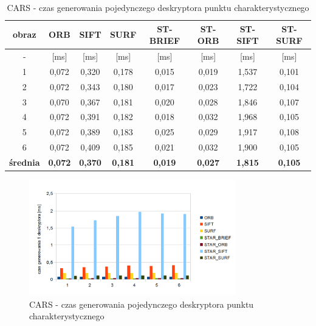 \begin{table}[htbp]
  \centering
  \caption{CARS - czas generowania pojedynczego deskryptora punktu charakterystycznego}
    \begin{tabular}{|c|c|c|c|c|c|c|c|}\hline

    obraz & \textbf{ORB} & \textbf{SIFT} & \textbf{SURF} & \textbf{ST-BRIEF} & \textbf{ST-ORB} & \textbf{ST-SIFT} & \textbf{ST-SURF} \\\hline

    - & [ms] & [ms] & [ms] & [ms] & [ms] & [ms] & [ms] \\\hline
    1 & 0,072 & 0,320 & 0,178 & 0,015 & 0,019 & 1,537 & 0,101 \\
    2 & 0,072 & 0,343 & 0,180 & 0,017 & 0,023 & 1,722 & 0,104 \\
    3 & 0,070 & 0,367 & 0,181 & 0,020 & 0,028 & 1,846 & 0,107 \\
    4 & 0,072 & 0,391 & 0,182 & 0,018 & 0,032 & 1,968 & 0,105 \\
    5 & 0,072 & 0,389 & 0,183 & 0,025 & 0,029 & 1,917 & 0,108 \\
    6 & 0,072 & 0,409 & 0,185 & 0,021 & 0,032 & 1,900 & 0,105 \\\hline
    \textbf{średnia} & \textbf{0,072} & \textbf{0,370} & \textbf{0,181} & \textbf{0,019} & \textbf{0,027} & \textbf{1,815} & \textbf{0,105} \\\hline
    
    \end{tabular}%
  \label{tab:cars_f3}%
\end{table}%


\begin{figure}
\centering
\includegraphics[width=0.8\textwidth]{pict/mikolajczyk/light/f3.png}
\caption{CARS - czas generowania pojedynczego deskryptora punktu charakterystycznego}
\label{fig:cars_f3}
\end{figure}


